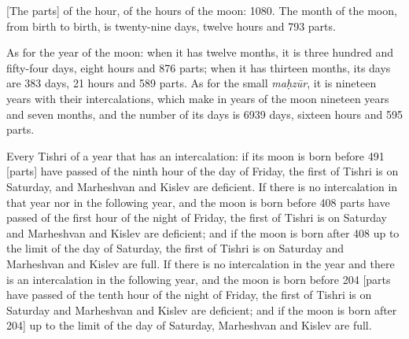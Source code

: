 \documentclass[11pt]{article}
\newcommand{\Pg}[1]{\marginpar{\footnotesize #1}}
\begin{document}
[The parts] of the hour, of the hours of the moon: 1080. The month of the moon, from birth to birth, is twenty-nine days, twelve hours and 793 parts.

\Pg{pp. 5–7}As for the year of the moon: when it has twelve months, it is three hundred and fifty-four days, eight hours and 876 parts; when it has thirteen months, its days are 383 days, 21 hours and 589 parts. As for the small \textit{maḥzūr}, it is nineteen years with their intercalations, which make in years of the moon nineteen years and seven months, and the number of its days is 6939 days, sixteen hours and 595 parts.

Every Tishri of a year that has an intercalation: if its moon is born before 491 [parts] have passed of the ninth hour of the day of Friday, the first of Tishri is on Saturday, and Marheshvan and Kislev are deficient. If there is no intercalation in that year nor in the following year, and the moon is born before 408 parts have passed of the first hour of the night of Friday, the first of Tishri is on Saturday and Marheshvan and Kislev are deficient; and if the moon is born after 408 up to the limit of the day of Saturday, the first of Tishri is on Saturday and Marheshvan and Kislev are full. If there is no intercalation in the year and there is an intercalation in the following year, and the moon is born before 204 [parts have passed of the tenth hour of the night of Friday, the first of Tishri is on Saturday and Marheshvan and Kislev are deficient; and if the moon is born after 204] up to the limit of the day of Saturday, Marheshvan and Kislev are full.
\end{document}
